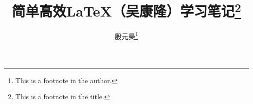 \documentclass[twoside]{ctexart}
\title{简单高效\LaTeX{}（吴康隆）学习笔记\thanks{This is a footnote in the title.}}
\author{殷元昊\thanks{This is a footnote in the author.}}
\date{}
\begin{document}
\maketitle

\renewcommand{\contentsname}{这是目录}
\tableofcontents

\renewcommand{\listfigurename}{这是插图目录}
\listoffigures

\renewcommand{\listtablename}{这是表格目录}
\listoftables


\theendnotes


\end{document}

